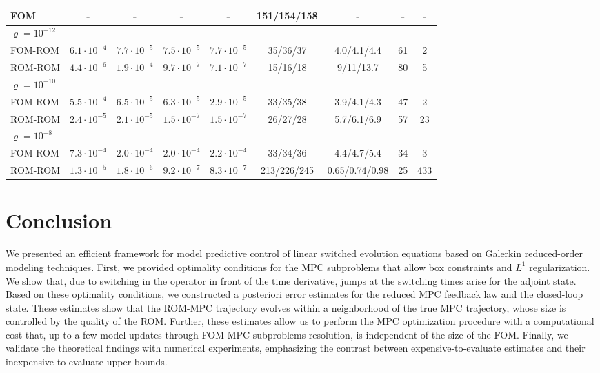 \documentclass[reqno]{amsart}
\newcommand{\abbr}[1]{\textsf{#1}\xspace}
\newcommand{\FOM}{\abbr{FOM}}
\newcommand{\ROM}{\abbr{ROM}}
\newcommand{\MPC}{\abbr{MPC}}
\begin{document}
{\begin{table}[h!]
\begin{tabular}{lcccccccc}
  \midrule
		\FOM & -  & -  &  - & - &151/154/158 & - & - & - \\
     \midrule
     $\varrho=10^{-12}$ &  &   &   &  &&  &  &  \\
     \midrule
		\FOM-\ROM   &$6.1\cdot 10^{-4}$ & $7.7\cdot 10^{-5}$ & $7.5\cdot 10^{-5}$ & $7.7\cdot 10^{-5}$ & 35/36/37 &4.0/4.1/4.4&61&2\\ 
        \ROM-\ROM   &$4.4\cdot 10^{-6}$ & $1.9\cdot 10^{-4}$ & $9.7\cdot 10^{-7}$ & $7.1\cdot 10^{-7}$ & 15/16/18 &9/11/13.7&80&5\\
        \midrule
     $\varrho=10^{-10}$ &  &   &   &  &&  &  &  \\
      \midrule
		\FOM-\ROM   &$5.5\cdot 10^{-4}$ & $6.5\cdot 10^{-5}$ & $6.3\cdot 10^{-5}$ & $2.9\cdot 10^{-5}$ & 33/35/38 &3.9/4.1/4.3& 47 &2\\ 
        \ROM-\ROM  &$2.4\cdot 10^{-5}$ & $2.1\cdot 10^{-5}$ & $1.5\cdot 10^{-7}$ & $1.5\cdot 10^{-7}$ & 26/27/28 &5.7/6.1/6.9&57&23\\
        \midrule
         $\varrho=10^{-8}$ &  &   &   &  &&  &  &  \\
      \midrule
		\FOM-\ROM   &$7.3\cdot 10^{-4}$ & $2.0\cdot 10^{-4}$ & $2.0\cdot 10^{-4}$ & $2.2\cdot 10^{-4}$ & 33/34/36 &4.4/4.7/5.4&34&3\\ 
        \ROM-\ROM  &$1.3\cdot 10^{-5}$ & $1.8\cdot 10^{-6}$ & $9.2\cdot 10^{-7}$ & $8.3\cdot 10^{-7}$ & 213/226/245 &0.65/0.74/0.98&25&433\\
		\bottomrule
	\end{tabular}
\end{table}
}
%
\section{Conclusion}\label{sec:conclusion}
%
We presented an efficient framework for model predictive control of linear switched evolution equations based on Galerkin reduced-order modeling techniques. First, we provided optimality conditions for the \MPC subproblems that allow box constraints and $L^1$ regularization. We show that, due to switching in the operator in front of the time derivative, jumps at the switching times arise for the adjoint state. Based on these optimality conditions, we constructed a posteriori error estimates for the reduced \MPC feedback law and the closed-loop state. These estimates show that the \ROM-\MPC trajectory evolves within a neighborhood of the true \MPC trajectory, whose size is controlled by the quality of the \ROM. Further, these estimates allow us to perform the \MPC optimization procedure with a computational cost that, up to a few model updates through \FOM-\MPC subproblems resolution, is independent of the size of the \FOM. Finally, we validate the theoretical findings with numerical experiments, emphasizing the contrast between expensive-to-evaluate estimates and their inexpensive-to-evaluate upper bounds.
\end{document}
